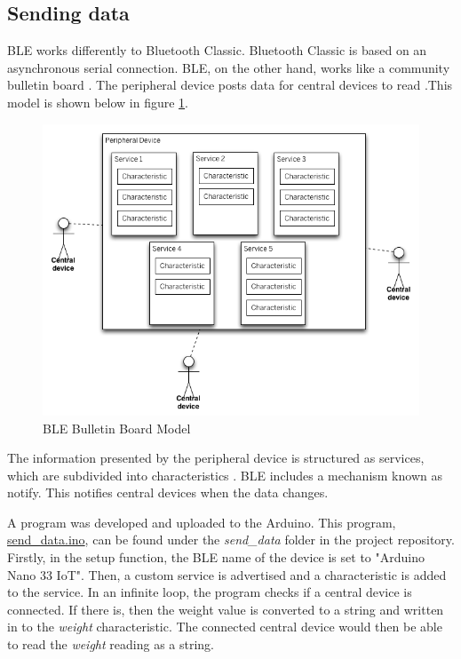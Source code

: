 \documentclass[class=report,11pt,crop=false]{standalone}
\begin{document}
	
		\subsection{Sending data}
		
			BLE works differently to Bluetooth Classic. Bluetooth Classic is based on an asynchronous serial connection. BLE, on the other hand, works like a community bulletin board \cite{ble}. The peripheral device posts data for central devices to read \cite{ble}.This model is shown below in figure \ref{fig:ble-bulletin-board-model}.
			
			\begin{figure}[h!]
				\centering
				\includegraphics[scale=0.5]{Figures/ble-bulletin-board-model}
				\caption{BLE Bulletin Board Model \cite{ble}}
				\label{fig:ble-bulletin-board-model}
			\end{figure}
			
			The information presented by the peripheral device is structured as services, which are subdivided into characteristics \cite{ble}. BLE includes a mechanism known as notify. This notifies central devices when the data changes.
			
			A program was developed and uploaded to the Arduino. This program, \href{https://github.com/karanimaan/EEE4113F-Project--Group-26/blob/main/send_data/send_data.ino}{send\_data.ino}, can be found under the \textit{send\_data} folder in the project repository.
			Firstly, in the setup function, the BLE name of the device is set to "Arduino Nano 33 IoT".
			Then, a custom service is advertised and a characteristic is added to the service.
			In an infinite loop, the program checks if a central device is connected. If there is, then the weight value is converted to a string and written in to the \textit{weight} characteristic. The connected central device would then be able to read the \textit{weight} reading as a string.
			
\end{document}
